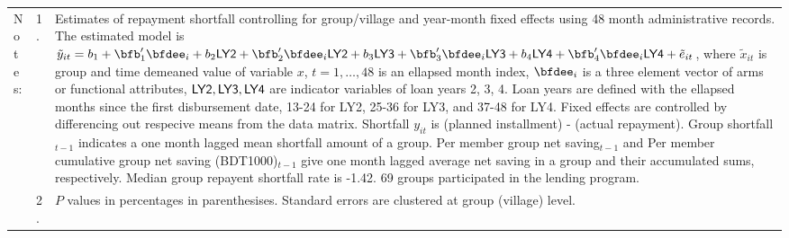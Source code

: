 \begin{minipage}[t]{14cm}
\begin{tabular}{>{\hfill\scriptsize}p{1cm}<{}>{\hfill\scriptsize}p{.25cm}<{}>{\scriptsize}p{12cm}<{\hfill}}
Notes: & 1. & Estimates of repayment shortfall controlling for group/village and year-month fixed effects using 48 month administrative records. The estimated model is $\tilde{y}_{it}=b_{1}+\bfb'_{1}\bfdee_{i}+b_{2}\mbox{\textsf{LY2}}+\bfb'_{2}\bfdee_{i}\mbox{\textsf{LY2}}+b_{3}\mbox{\textsf{LY3}}+\bfb'_{3}\bfdee_{i}\mbox{\textsf{LY3}}+b_{4}\mbox{\textsf{LY4}}+\bfb'_{4}\bfdee_{i}\mbox{\textsf{LY4}}+\tilde{e}_{it}$, where $\tilde{x}_{it}$ is group and time demeaned value of variable $x$, $t=1,\dots, 48$ is an ellapsed month index, $\bfdee_{i}$ is a three element vector of arms or functional attributes, $\mbox{\textsf{LY2}}, \mbox{\textsf{LY3}}, \mbox{\textsf{LY4}}$ are indicator variables of loan years 2, 3, 4. Loan years are defined with the ellapsed months since the first disbursement date, 13-24 for \textsf{LY2}, 25-36 for \textsf{LY3}, and 37-48 for \textsf{LY4}. Fixed effects are controlled by differencing out respecive means from the data matrix. Shortfall $y_{it}$ is (planned installment) - (actual repayment). \textsf{Group shortfall}$_{t-1}$ indicates a one month lagged mean shortfall amount of a group. \textsf{Per member group net saving}$_{t-1}$ and \textsf{Per member cumulative group net saving (BDT1000)}$_{t-1}$ give one month lagged average net saving in a group and their accumulated sums, respectively. Median group repayent shortfall rate is -1.42. 69 groups participated in the lending program.  \\
& 2. &  $P$ values in percentages in parenthesises. Standard errors are clustered at group (village) level. %
 \end{tabular}
\end{minipage} \\\\



